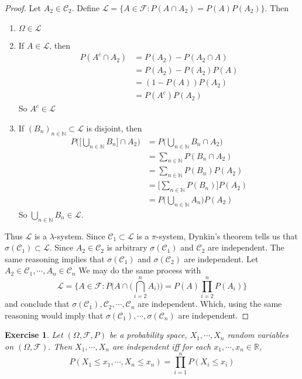 \documentclass[12pt]{amsart}
\newtheorem{ex}[thm]{Exercise}
\newcommand{\lam}{\lambda}
\newcommand{\sig}{\sigma}
\newcommand{\Om}{\Omega}
\newcommand{\N}{\mathbb{N}}
\newcommand{\R}{\mathbb{R}}
\newcommand{\MC}{\mathcal{C}}
\newcommand{\MF}{\mathcal{F}}
\newcommand{\ML}{\mathcal{L}}
\begin{document}
	\begin{proof}
		Let $A_2 \in \MC_2$. Define $\ML = \{A \in \MF: P(A\cap A_2) = P(A)P(A_2)\}$. Then 
		\begin{enumerate}
			\item $\Om \in \ML$
			\item If $A \in \ML$, then 
			\begin{align*}
				P(A^c \cap A_2) 
				&= P(A_2) - P(A_2 \cap A) \\
				&= P(A_2) - P(A_2) P(A) \\
				&= (1- P(A))P(A_2) \\
				&= P(A^c)P(A_2)
			\end{align*}
			So $A^c \in \ML$
			\item If $(B_n)_{n \in \N} \subset \ML$ is disjoint, then 
			\begin{align*}
				P\bigg( \bigg[\bigcup_{n \in \N}B_n \bigg] \cap A_2\bigg) 
				&= P \bigg( \bigcup_{n \in \N}B_n \cap A_2 \bigg) \\
				&= \sum_{n \in \N}P(B_n \cap A_2) \\
				&= \sum_{n \in \N}P(B_n) P(A_2) \\
				&=   \bigg[\sum_{n \in \N}P(B_n)\bigg]P(A_2)  \\
				&=  P\bigg( \bigcup_{n \in \N} A_n\bigg) P(A_2) 
			\end{align*} 
			So $\bigcup\limits_{n \in \N}B_n \in \ML$. 
		\end{enumerate}
		Thus $\ML$ is a $\lam$-system. Since $\MC_1 \subset \ML$ is a $\pi$-system, Dynkin's theorem tells us that $\sig(\MC_1) \subset \ML$. Since $A_2 \in \MC_2$ is arbitrary $\sig(\MC_1)$ and $\MC_2$ are independent. The same reasoning implies that $\sig(\MC_1)$ and $\sig(\MC_2)$ are independent. Let $A_2 \in \MC_1, \cdots, A_n \in \MC_n$ We may do the same process with $$\ML = \bigg \{A \in \MF: P\bigg(A \cap \bigg(\bigcap_{i=2}^n A_i\bigg) \bigg) = P(A)\prod_{i=2}^n P(A_i)\bigg\}$$ and conclude that $\sig(\MC_1), \MC_2, \cdots, \MC_n$ are independent. Which, using the same reasoning would imply that $\sig(\MC_1), \cdots, \sig(\MC_n)$ are independent.
	\end{proof}
	
	\begin{ex}
		Let $(\Om, \MF, P)$ be a probability space, $X_1, \cdots, X_n$ random variables on $(\Om, \MF)$. Then $X_1, \cdots, X_n$ are independent iff for each $x_1, \cdots, x_n \in \R$, $$P(X_1 \leq x_1, \cdots, X_n \leq x_n ) = \prod_{i=1}^nP(X_i \leq x_i)$$
	\end{ex}
	
\end{document}
